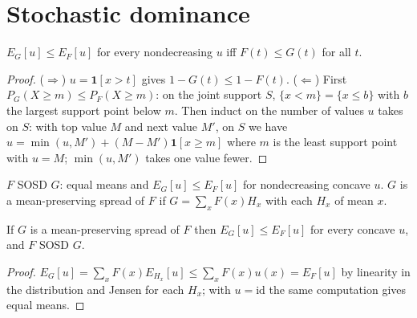\section{Stochastic dominance}
\label{sec:stochastic-dominance}

\begin{theorem}
\label{thm:fosd}
\leanok
{}
$E_G[u] \le E_F[u]$ for every nondecreasing $u$ iff $F(t) \le G(t)$ for all $t$.
\end{theorem}
\begin{proof}
\leanok
($\Rightarrow$) $u = \mathbf 1[x > t]$ gives $1 - G(t) \le 1 - F(t)$. ($\Leftarrow$) First
$P_G(X \ge m) \le P_F(X \ge m)$: on the joint support $S$, $\{x < m\} = \{x \le b\}$ with $b$ the
largest support point below $m$. Then induct on the number of values $u$ takes on $S$: with top value
$M$ and next value $M'$, on $S$ we have $u = \min(u, M') + (M - M')\mathbf 1[x \ge m]$ where $m$ is the
least support point with $u = M$; $\min(u,M')$ takes one value fewer.
\end{proof}

\begin{definition}
\label{def:sosd}
\leanok
{}
$F$ SOSD $G$: equal means and $E_G[u] \le E_F[u]$ for nondecreasing concave $u$. $G$ is a
mean-preserving spread of $F$ if $G = \sum_x F(x) H_x$ with each $H_x$ of mean $x$.
\end{definition}

\begin{theorem}
\label{thm:mps-sosd}
\leanok
{}
If $G$ is a mean-preserving spread of $F$ then $E_G[u] \le E_F[u]$ for every concave $u$, and $F$ SOSD $G$.
\end{theorem}
\begin{proof}
\leanok
$E_G[u] = \sum_x F(x) E_{H_x}[u] \le \sum_x F(x) u(x) = E_F[u]$ by linearity in the distribution and
Jensen for each $H_x$; with $u = \mathrm{id}$ the same computation gives equal means.
\end{proof}

